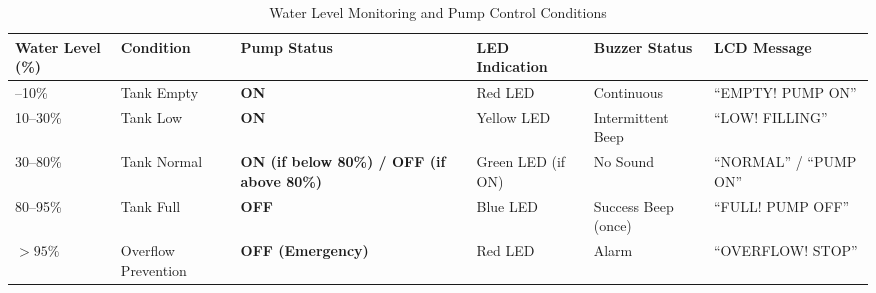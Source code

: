 \documentclass[12pt,a4paper]{article}
\begin{document}
\begin{table}[H]
    \centering
    \small
    \begin{tabularx}{\textwidth}{
        |>{\centering\arraybackslash}p{1.3cm}
        |>{\centering\arraybackslash}X
        |>{\centering\arraybackslash}p{2.3cm}
        |>{\centering\arraybackslash}p{2.4cm}
        |>{\centering\arraybackslash}p{2.4cm}
        |>{\centering\arraybackslash}p{3.1cm}|
    }
        \hline

        \textbf{Water Level (\%)} &
        \textbf{Condition} &
        \textbf{Pump Status} &
        \textbf{LED Indication} &
        \textbf{Buzzer Status} &
        \textbf{LCD Message} \\

        \hline

        0--10\% &
        Tank Empty &
        \textbf{ON} &
        Red LED &
        Continuous &
        ``EMPTY! PUMP ON'' \\

        \hline

        10--30\% &
        Tank Low &
        \textbf{ON} &
        Yellow LED &
        Intermittent Beep &
        ``LOW! FILLING'' \\

        \hline

        30--80\% &
        Tank Normal &
        \textbf{ON (if below 80\%) / OFF (if above 80\%)} &
        Green LED (if ON) &
        No Sound &
        ``NORMAL'' / ``PUMP ON'' \\

        \hline

        80--95\% &
        Tank Full &
        \textbf{OFF} &
        Blue LED &
        Success Beep (once) &
        ``FULL! PUMP OFF'' \\

        \hline

        $>95\%$ &
        Overflow Prevention &
        \textbf{OFF (Emergency)} &
        Red LED &
        Alarm &
        ``OVERFLOW! STOP'' \\

        \hline

    \end{tabularx}

    \caption{Water Level Monitoring and Pump Control Conditions}
    \label{tab:water_level_control}
\end{table}

\end{document}
